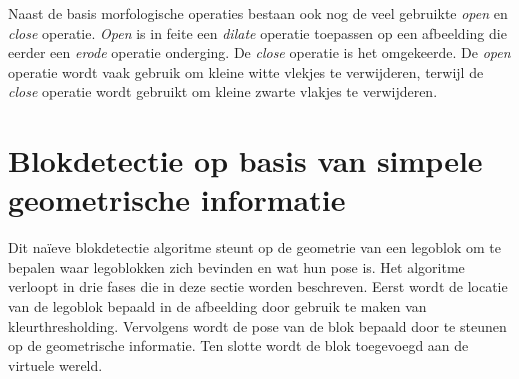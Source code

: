 Naast de basis morfologische operaties bestaan ook nog de veel gebruikte \textit{open} en \textit{close} operatie. \textit{Open} is in feite een \textit{dilate} operatie toepassen op een afbeelding die eerder een \textit{erode} operatie onderging. De \textit{close} operatie is het omgekeerde. De \textit{open} operatie wordt vaak gebruik om kleine witte vlekjes te verwijderen, terwijl de \textit{close} operatie wordt gebruikt om kleine zwarte vlakjes te verwijderen.

\section{Blokdetectie op basis van simpele geometrische informatie} \label{sec:naive_algo}
Dit na\"ieve blokdetectie algoritme steunt op de geometrie van een legoblok om te bepalen waar legoblokken zich bevinden en wat hun pose is. Het algoritme verloopt in drie fases die in deze sectie worden beschreven. Eerst wordt de locatie van de legoblok bepaald in de afbeelding door gebruik te maken van kleurthresholding. Vervolgens wordt de pose van de blok bepaald door te steunen op de geometrische informatie. Ten slotte wordt de blok toegevoegd aan de virtuele wereld.

%

